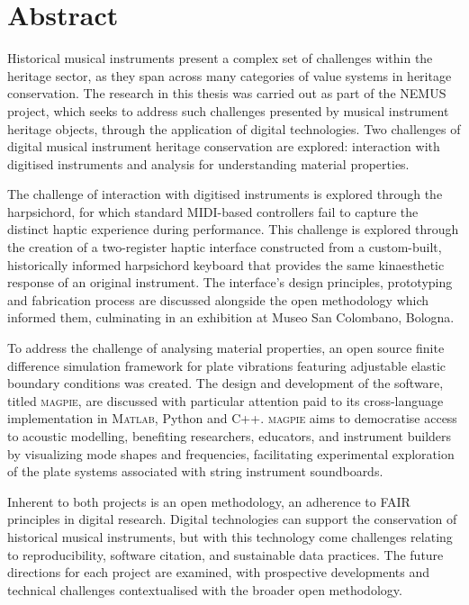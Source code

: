 \section*{\centering Abstract}

Historical musical instruments present a complex set of challenges within the
heritage sector, as they span across many categories of value systems in
heritage conservation. The research in this thesis was carried out as part of
the NEMUS project, which seeks to address such challenges presented by musical
instrument heritage objects, through the application of digital technologies. Two
challenges of digital musical instrument heritage conservation are explored:
interaction with digitised instruments and analysis for understanding material
properties. 

The challenge of interaction with digitised instruments is explored through the
harpsichord, for which standard MIDI-based controllers fail to capture the
distinct haptic experience during performance. This challenge is explored
through the creation of a two-register haptic interface constructed from a
custom-built, historically informed harpsichord keyboard that provides the same
kinaesthetic response of an original instrument. The interface's design
principles, prototyping and fabrication process are discussed alongside the open
methodology which informed them, culminating in an exhibition at Museo San
Colombano, Bologna. 

To address the challenge of analysing material properties, an open source finite
difference simulation framework for plate vibrations featuring adjustable
elastic boundary conditions was created. The design and development of the
software, titled \textsc{magpie}, are discussed with particular attention paid
to its cross-language implementation in M\textsc{atlab}, Python and
C\textsc{++}. \textsc{magpie} aims to democratise access to acoustic modelling,
benefiting researchers, educators, and instrument builders by visualizing mode
shapes and frequencies, facilitating experimental exploration of the plate
systems associated with string instrument soundboards. 

Inherent to both projects is an open methodology, an adherence to FAIR
principles in digital research. Digital technologies can support the conservation of historical musical instruments, but with this technology come challenges relating to reproducibility, software citation, and sustainable data practices. The future
directions for each project are examined, with prospective developments and
technical challenges contextualised with the broader open methodology.


\cleardoublepage{}